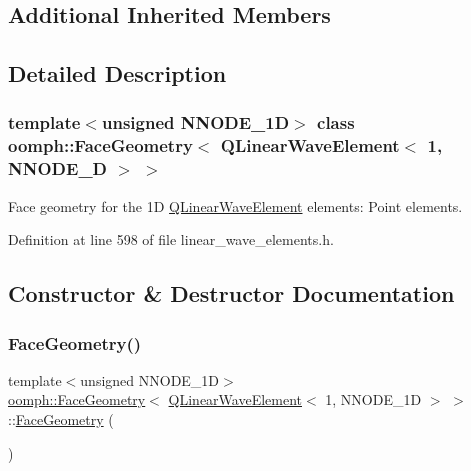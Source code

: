 \subsection*{Additional Inherited Members}


\subsection{Detailed Description}
\subsubsection*{template$<$unsigned N\+N\+O\+D\+E\+\_\+1D$>$\newline
class oomph\+::\+Face\+Geometry$<$ Q\+Linear\+Wave\+Element$<$ 1, N\+N\+O\+D\+E\+\_\+D $>$ $>$}

Face geometry for the 1D \hyperlink{classoomph_1_1QLinearWaveElement}{Q\+Linear\+Wave\+Element} elements\+: Point elements. 

Definition at line 598 of file linear\+\_\+wave\+\_\+elements.\+h.



\subsection{Constructor \& Destructor Documentation}
\mbox{\label{classoomph_1_1FaceGeometry_3_01QLinearWaveElement_3_011_00_01NNODE__1D_01_4_01_4_a0fd7955ea3d50a8effb413631d32aec7}} 
\subsubsection{\texorpdfstring{Face\+Geometry()}{FaceGeometry()}}
{\footnotesize\ttfamily template$<$unsigned N\+N\+O\+D\+E\+\_\+1D$>$ \\
\hyperlink{classoomph_1_1FaceGeometry}{oomph\+::\+Face\+Geometry}$<$ \hyperlink{classoomph_1_1QLinearWaveElement}{Q\+Linear\+Wave\+Element}$<$ 1, N\+N\+O\+D\+E\+\_\+1D $>$ $>$\+::\hyperlink{classoomph_1_1FaceGeometry}{Face\+Geometry} (\begin{DoxyParamCaption}{ }\end{DoxyParamCaption})\hspace{0.3cm}{\ttfamily [inline]}}



